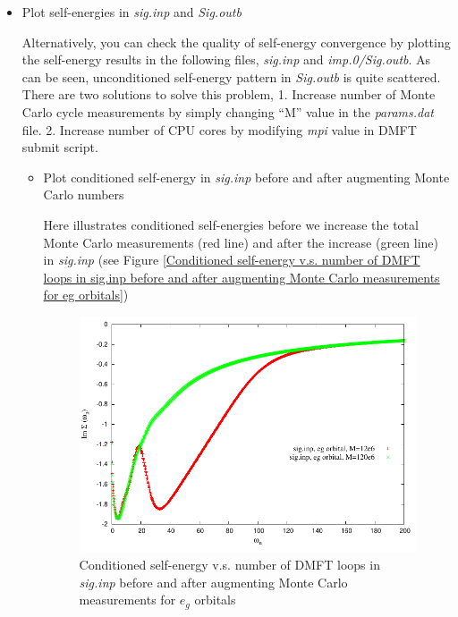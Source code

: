 \documentclass[12 pt]{article}
\begin{document}
\begin{itemize}[leftmargin=0.2in]
	    \item Plot self-energies in \emph{sig.inp} and \emph{Sig.outb}

  Alternatively, you can check the quality of self-energy convergence by plotting the self-energy results in the 
following files, \emph{sig.inp} and \emph{imp.0/Sig.outb}. As can be seen, unconditioned self-energy pattern in 
\emph{Sig.outb} is quite scattered. There are two solutions to solve this problem, 1. Increase number of Monte 
Carlo cycle measurements by simply changing ``M'' value in the \emph{params.dat} file. 2. Increase number of CPU 
cores by modifying \emph{mpi} value in DMFT submit script.

  \cleardoublepage

		  \begin{itemize}[leftmargin=0.5in]

		  \item Plot conditioned self-energy in \emph{sig.inp} before and after augmenting Monte Carlo 
numbers

  Here illustrates conditioned self-energies before we increase the total Monte Carlo measurements (red line) 
and after the increase (green line) in \emph{sig.inp} (see Figure 
\ref{Conditioned self-energy v.s. number of DMFT loops in sig.inp before and after augmenting Monte Carlo
 measurements for eg orbitals})

  \begin{figure}[ht]
    \centering
    \captionsetup{justification=centering}
    \caption{Conditioned self-energy v.s. number of DMFT loops in \emph{sig.inp} before and after augmenting Monte 
Carlo measurements for $e_g$ orbitals}
    \label{Conditioned self-energy v.s. number of DMFT loops in sig.inp before and after augmenting Monte Carlo 
measurements for eg orbitals}
    \vspace{2ex}
    \includegraphics[scale=1.3]{gnuplotSelfEnergysiginpMC}   
  \end{figure}


\end{itemize}
\end{itemize}
\end{document}
